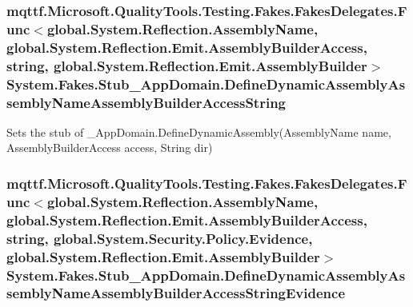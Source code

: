 \hypertarget{class_system_1_1_fakes_1_1_stub___app_domain_acbd5f9ff1f9c013e6f8d598e149dd803}{
\subsubsection[{Define\-Dynamic\-Assembly\-Assembly\-Name\-Assembly\-Builder\-Access\-String}]{\setlength{\rightskip}{0pt plus 5cm}mqttf.\-Microsoft.\-Quality\-Tools.\-Testing.\-Fakes.\-Fakes\-Delegates.\-Func$<$global.\-System.\-Reflection.\-Assembly\-Name, global.\-System.\-Reflection.\-Emit.\-Assembly\-Builder\-Access, string, global.\-System.\-Reflection.\-Emit.\-Assembly\-Builder$>$ System.\-Fakes.\-Stub\-\_\-\-App\-Domain.\-Define\-Dynamic\-Assembly\-Assembly\-Name\-Assembly\-Builder\-Access\-String}}\label{class_system_1_1_fakes_1_1_stub___app_domain_acbd5f9ff1f9c013e6f8d598e149dd803}


Sets the stub of \-\_\-\-App\-Domain.\-Define\-Dynamic\-Assembly(\-Assembly\-Name name, Assembly\-Builder\-Access access, String dir)

\hypertarget{class_system_1_1_fakes_1_1_stub___app_domain_a999e56770674d92f305c85c0d119583a}{
\subsubsection[{Define\-Dynamic\-Assembly\-Assembly\-Name\-Assembly\-Builder\-Access\-String\-Evidence}]{\setlength{\rightskip}{0pt plus 5cm}mqttf.\-Microsoft.\-Quality\-Tools.\-Testing.\-Fakes.\-Fakes\-Delegates.\-Func$<$global.\-System.\-Reflection.\-Assembly\-Name, global.\-System.\-Reflection.\-Emit.\-Assembly\-Builder\-Access, string, global.\-System.\-Security.\-Policy.\-Evidence, global.\-System.\-Reflection.\-Emit.\-Assembly\-Builder$>$ System.\-Fakes.\-Stub\-\_\-\-App\-Domain.\-Define\-Dynamic\-Assembly\-Assembly\-Name\-Assembly\-Builder\-Access\-String\-Evidence}}\label{class_system_1_1_fakes_1_1_stub___app_domain_a999e56770674d92f305c85c0d119583a}


